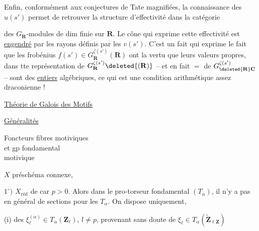 Enfin, conformément aux conjectures de Tate magnifiées, la connaissance des $u(s')$ permet de retrouver la structure d'effectivité dans la catégorie

des $G_{\mathbf R}$-modules de dim finie sur $\mathbf R$. Le cône qui exprime cette effectivité est \uline{engendré} par les  rayons définis par les $v(s')$. C'est un fait qui exprime  le fait que les frobénius $f(s')\in G_{\mathbf R}^{\zeta(s')}(\mathbf R)$ ont la vertu que leurs valeurs propres, dans tte représentation de $G_{\mathbf R}^{\zeta(s')}\deleted{(\mathbf R)}$ -- et en fait $=$ de $G_{\deleted{\mathbf R}\mathbf C}^{\zeta(s')}$ -- sont des \uline{entiers} algébriques, ce qui est une condition arithmétique assez draconienne !


\begin{center}
\uline{Théorie de Galois des Motifs}

\uline{Généralités}
\end{center}



\begin{flushright}
Foncteurs fibres motiviques\\
et gp fondamental\\
motivique
\end{flushright}


$X$ préschéma connexe, 

$1^\circ)$ $X_{\mathrm{réd}}$ de car $p>0$. Alors dans le pro-torseur fondamental $(T_\alpha)$, il n'y a pas en général de sections pour les $T_\alpha$.  On dispose uniquement, 

(i) des $\xi_{\ell}^{(\alpha)}\in T_\alpha(\mathbf Z_{\ell})$, $l\ne p$, provenant sans doute de $\xi_{\ell}\in T_\alpha(\widetilde{\mathbf Z}_{\ell\mathbf Z})$

